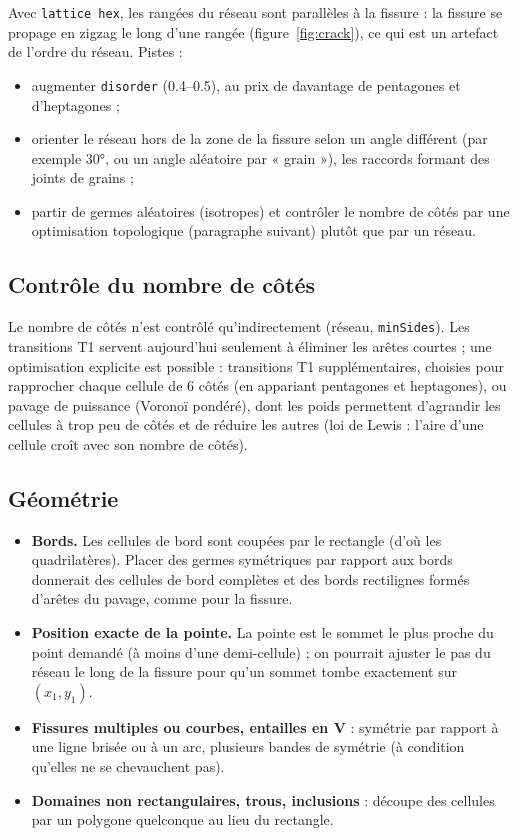 \documentclass[11pt,a4paper]{article}
\newcommand{\code}[1]{\texttt{#1}}
\begin{document}
Avec \code{lattice hex}, les rangées du réseau sont parallèles à la fissure : la fissure se propage en zigzag le
long d'une rangée (figure~\ref{fig:crack}), ce qui est un artefact de l'ordre du réseau. Pistes :
\begin{itemize}[nosep]
  \item augmenter \code{disorder} (0.4--0.5), au prix de davantage de pentagones et d'heptagones ;
  \item orienter le réseau hors de la zone de la fissure selon un angle différent (par exemple \ang{30}, ou un
    angle aléatoire par « grain »), les raccords formant des joints de grains ;
  \item partir de germes aléatoires (isotropes) et contrôler le nombre de côtés par une optimisation
    topologique (paragraphe suivant) plutôt que par un réseau.
\end{itemize}

\subsection{Contrôle du nombre de côtés}

Le nombre de côtés n'est contrôlé qu'indirectement (réseau, \code{minSides}). Les transitions T1 servent
aujourd'hui seulement à éliminer les arêtes courtes ; une optimisation explicite est possible : transitions T1
supplémentaires, choisies pour rapprocher chaque cellule de 6 côtés (en appariant pentagones et heptagones),
ou pavage de puissance (Voronoï pondéré),
dont les poids permettent d'agrandir les cellules à trop peu de côtés et de réduire les autres (loi de Lewis :
l'aire d'une cellule croît avec son nombre de côtés).

\subsection{Géométrie}

\begin{itemize}[nosep]
  \item \textbf{Bords.} Les cellules de bord sont coupées par le rectangle (d'où les quadrilatères). Placer des
    germes symétriques par rapport aux bords donnerait des cellules de bord complètes et des bords rectilignes
    formés d'arêtes du pavage, comme pour la fissure.
  \item \textbf{Position exacte de la pointe.} La pointe est le sommet le plus proche du point demandé (à moins
    d'une demi-cellule) ; on pourrait ajuster le pas du réseau le long de la fissure pour qu'un sommet tombe
    exactement sur $(x_1,y_1)$.
  \item \textbf{Fissures multiples ou courbes, entailles en V} : symétrie par rapport à une ligne brisée ou
    à un arc, plusieurs bandes de symétrie (à condition qu'elles ne se chevauchent pas).
  \item \textbf{Domaines non rectangulaires, trous, inclusions} : découpe des cellules par un polygone quelconque
    au lieu du rectangle.
\end{itemize}
\end{document}
